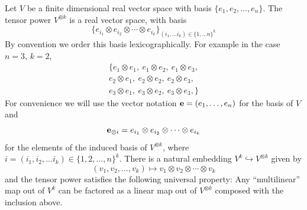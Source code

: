 Let $V$ be a finite dimensional real vector space with basis $\{e_1, e_2, \ldots, e_n\}$. The tensor power $V^{\otimes k}$ is a real vector space, with basis
\[
  \{e_{i_1} \otimes e_{i_2} \otimes \cdots \otimes e_{i_k}\}_{(i_1, \ldots i_k) \in \{1, \ldots n\}^k}
\]
By convention we order this basis lexicographically. For example in the case $n = 3$, $k = 2$, 
\begin{align*}
  \{ e_1 \otimes e_1,~
  e_1 \otimes e_2,~
  e_1 \otimes e_3, \\
  e_2 \otimes e_1,~
  e_2 \otimes e_2,~
  e_2 \otimes e_3, \\
  e_3 \otimes e_1,~
  e_3 \otimes e_2,~
  e_3 \otimes e_3, \}
\end{align*}
For convenience we will use the vector notation ${\bf e} = (e_1, \ldots, e_n)$ for the basis of $V$ and 
\[
  \bf{e}_{\otimes i} = e_{i_1} \otimes e_{i_2} \otimes \cdots \otimes e_{i_k}
\]
for the elements of the induced basis of $V^{\otimes k}$, where $i = (i_1, i_2, \ldots i_k) \in {\{1, 2, \ldots, n\}}^k$.
There is a natural embedding $V^k \hookrightarrow V^{\otimes k}$ given by
\[
  (v_1, v_2, \ldots, v_k) \mapsto v_1 \otimes v_2 \otimes \cdots \otimes v_k
\]
and the tensor power satisfies the following universal property: Any ``multilinear'' map out of $V^k$ can be factored as a linear map out of $V^{\otimes k}$ composed with the inclusion above. 
\begin{figure}[h] \centering
{}
\end{figure}




